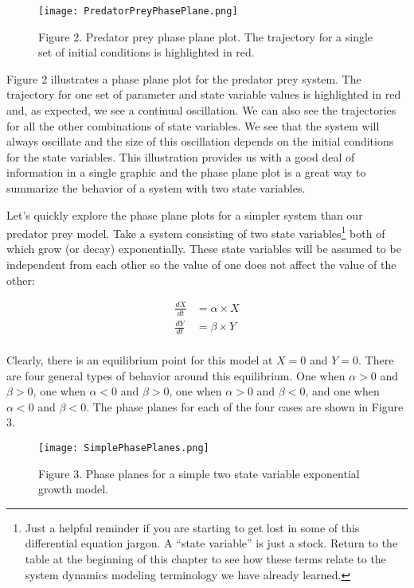 \documentclass[]{memoir}
\let\Oldincludegraphics\includegraphics
\renewcommand{\includegraphics}[1]{\Oldincludegraphics[max size={\textwidth}{\textheight}]{#1}}
\begin{document}
\begin{figure}[htbp]
\centering
\texttt{[image: PredatorPreyPhasePlane.png]}
\caption{Figure 2. Predator prey phase plane plot. The trajectory for a
single set of initial conditions is highlighted in red.}
\end{figure}

Figure 2 illustrates a phase plane plot for the predator prey system.
The trajectory for one set of parameter and state variable values is
highlighted in red and, as expected, we see a continual oscillation. We
can also see the trajectories for all the other combinations of state
variables. We see that the system will always oscillate and the size of
this oscillation depends on the initial conditions for the state
variables. This illustration provides us with a good deal of information
in a single graphic and the phase plane plot is a great way to summarize
the behavior of a system with two state variables.

Let's quickly explore the phase plane plots for a simpler system than
our predator prey model. Take a system consisting of two state
variables\footnote{Just a helpful reminder if you are starting to get
  lost in some of this differential equation jargon. A ``state
  variable'' is just a stock. Return to the table at the beginning of
  this chapter to see how these terms relate to the system dynamics
  modeling terminology we have already learned.} both of which grow (or
decay) exponentially. These state variables will be assumed to be
independent from each other so the value of one does not affect the
value of the other:

\[
\begin{aligned}
\frac{dX}{dt} &= \alpha \times X \\
\frac{dY}{dt} &= \beta \times Y \\
\end{aligned}
\]

Clearly, there is an equilibrium point for this model at $X=0$ and
$Y=0$. There are four general types of behavior around this equilibrium.
One when $\alpha>0$ and $\beta>0$, one when $\alpha<0$ and $\beta>0$,
one when $\alpha>0$ and $\beta<0$, and one when $\alpha<0$ and
$\beta<0$. The phase planes for each of the four cases are shown in
Figure 3.

\begin{figure}[htbp]
\centering
\texttt{[image: SimplePhasePlanes.png]}
\caption{Figure 3. Phase planes for a simple two state variable
exponential growth model.}
\end{figure}
\end{document}
